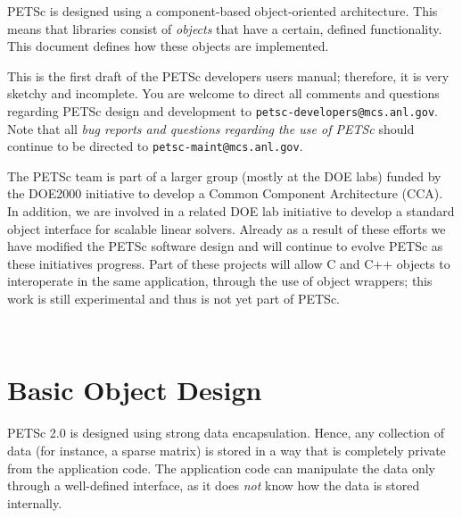 PETSc is designed using a component-based object-oriented
architecture. This means that libraries consist of {\em objects} that
have a certain, defined functionality. This document defines how these
objects are implemented.

\vspace{1cm}

This is the first draft of the PETSc developers users manual;
therefore, it is very sketchy and incomplete. You are welcome to
direct all comments and questions regarding PETSc design and
development to {\tt petsc-developers@mcs.anl.gov}.  Note that all {\em
bug reports and questions regarding the use of PETSc} should continue
to be directed to {\tt petsc-maint@mcs.anl.gov}.

The PETSc team is part of a larger group (mostly at the DOE labs) funded by 
the DOE2000 initiative to develop a Common Component Architecture (CCA). In addition,
we are involved in a related DOE lab initiative to develop a standard object 
interface for scalable linear solvers.  Already as a result of these efforts
we have modified the PETSc software design and will continue to evolve PETSc as
these initiatives progress.  Part of these projects will allow C and C++ objects
to interoperate in the same application, through the use of object wrappers; this
work is still experimental and thus is not yet part of PETSc. 

%
%

\newpage
\hbox{ }
\newpage


\chapter{Basic Object Design}
\label{chapter:design}

PETSc 2.0 is designed using strong data encapsulation.  Hence,
any collection of data (for instance, a sparse matrix) is stored in 
a way that is completely private from the application code. The application 
code can manipulate the data only through a well-defined interface, as it 
does {\em not} know how the data is stored internally. 

